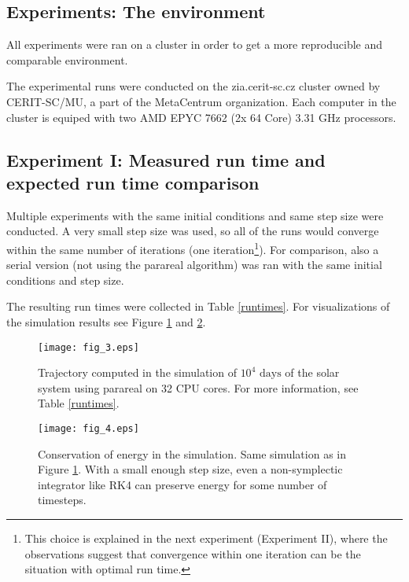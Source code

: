 \documentclass[conference]{IEEEtran}
\begin{document}
\subsection{Experiments: The environment}
All experiments were ran on a cluster in order to get a more reproducible and comparable environment. 

The experimental runs were conducted on the zia.cerit-sc.cz cluster owned by CERIT-SC/MU, a part of the MetaCentrum organization. Each computer in the cluster is equiped with two AMD EPYC 7662 (2x 64 Core) 3.31 GHz processors.

\subsection{Experiment I: Measured run time and expected run time comparison}

Multiple experiments with the same initial conditions and same step size were conducted. A very small step size was used, so all of the runs would converge within the same number of iterations (one iteration\footnote{This choice is explained in the next experiment (Experiment II), where the observations suggest that convergence within one iteration can be the situation with optimal run time.}). For comparison, also a serial version (not using the parareal algorithm) was ran with the same initial conditions and step size.

The resulting run times were collected in Table \ref{runtimes}. For visualizations of the simulation results see Figure \ref{sim} and \ref{energy}.

\begin{figure}[htbp]
\centerline{\texttt{[image: fig\_3.eps]}}
\caption{Trajectory computed in the simulation of $10^4\text{ days}$ of the solar system using parareal on 32 CPU cores. For more information, see Table \ref{runtimes}.}
\label{sim}
\end{figure}

\begin{figure}[htbp]
\centerline{\texttt{[image: fig\_4.eps]}}
\caption{Conservation of energy in the simulation. Same simulation as in Figure \ref{sim}. With a small enough step size, even a non-symplectic integrator like RK4 can preserve energy for some number of timesteps.}
\label{energy}
\end{figure}
\end{document}
